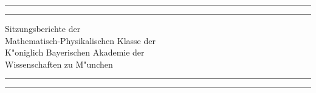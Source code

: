 \documentclass[a4paper, 11pt, oneside]{article}
\begin{document}
\frakfamily
\renewcommand{\contentsname}{
\frakfamily{Inhaltsverzeichnis}
}
\let\origcftsecfont\cft
\let\origcftsecpagefont\cftsecpagefont
\let\origcftsecafterpnum\cftsecafterpnum
\renewcommand{\cftsecpagefont}{\frakfamily{\origcftsecpagefont}}
\renewcommand{\cftsecafterpnum}{\frakfamily{\origcftsecafterpnum}}
\let\origcftsubsecpagefont\cftsubsecpagefont
\let\origcftsubsecafterpnum\cftsubsecafterpnum
\renewcommand{\cftsubsecpagefont}{\frakfamily{\origcftsubsecpagefont}}
\renewcommand{\cftsubsecafterpnum}{\frakfamily{\origcftsubsecafterpnum}}
\let\origcftsubsubsecpagefont\cftsubsubsecpagefont
\let\origcftsubsubsecafterpnum\cftsubsubsecafterpnum
\renewcommand{\cftsubsubsecpagefont}{\frakfamily{\origcftsubsubsecpagefont}}
\renewcommand{\cftsubsubsecafterpnum}{\frakfamily{\origcftsubsubsecafterpnum}}
\begin{titlepage} %
	\centering %

	
	\rule{\textwidth}{1.6pt}\vspace*{-\baselineskip}\vspace*{2pt} %
	\rule{\textwidth}{0.4pt} %
	
	\vspace{1\baselineskip} %
	
	{\Huge Sitzungsberichte der\\[1.25pt] Mathematisch-Physikalischen Klasse der\\[1.25pt] K"oniglich Bayerischen Akademie der\\[1.25pt] Wissenschaften zu M"unchen\\[1.25pt]}
	
	\vspace{1\baselineskip} %

	\rule{\textwidth}{0.4pt}\vspace*{-\baselineskip}\vspace{3.2pt} %
	\rule{\textwidth}{1.6pt} %
	
	\vspace{1\baselineskip} %
	
	

\end{titlepage}
\end{document}
